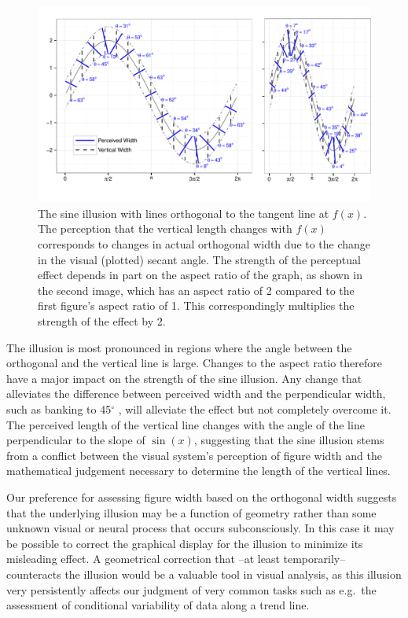 \documentclass[11pt]{isuthesis}\usepackage[]{graphicx}\usepackage[]{color}
\begin{document}
\begin{figure}[h!tbp]
\includegraphics[width=.9\textwidth, keepaspectratio=TRUE]{fig-transform-illustration}
\centering
\caption[Geometry of the sine illusion]{\label{fig:OrthogonalWidth} The sine illusion with lines orthogonal to the tangent line at $f(x)$. The perception that the vertical length changes with $f(x)$ corresponds to changes in actual orthogonal width due to the change in the visual (plotted) secant angle. The strength of the perceptual effect depends in part on the aspect ratio of the graph, as shown in the second image, which has an aspect ratio of 2 compared to the first figure's aspect ratio of 1. This correspondingly multiplies the strength of the effect by 2. 
}
\end{figure}
The illusion is most pronounced in regions where the angle between the orthogonal  and the vertical line is large. Changes to the aspect ratio therefore have a major impact on the strength of the sine illusion. Any change that alleviates the difference between perceived width and the perpendicular width, such as banking to 45$^\circ$ \citep{cleveland:88}, will alleviate the effect but not completely overcome it. 
The perceived length of the vertical line changes with the angle of the line perpendicular to the slope of $\sin(x)$, suggesting that the sine illusion stems from a conflict between the visual system's perception of figure width and the mathematical judgement necessary to determine the length of the vertical lines. 



Our preference for assessing figure width based on the orthogonal width suggests that the underlying illusion may be a function of geometry rather than some unknown visual or neural process that occurs subconsciously. In this  case it may be  possible to correct the graphical display for the illusion to minimize its misleading effect. A geometrical correction that  --at least temporarily-- counteracts the illusion would be a valuable tool in visual analysis, as this illusion very persistently affects our judgment of very common tasks  such as e.g.~the assessment of conditional variability of data along a trend line.
\end{document}

